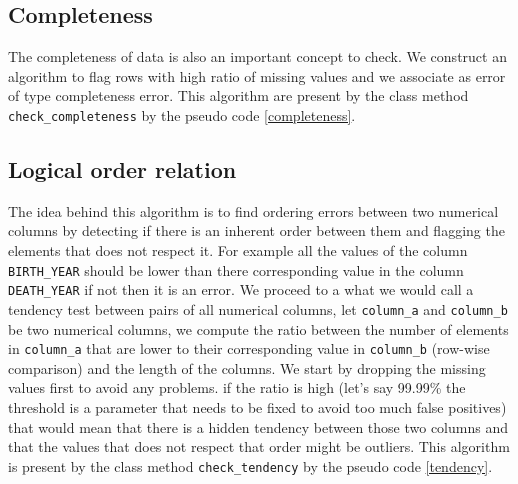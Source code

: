 \documentclass{article}
\begin{document}
\subsection{Completeness} %
\label{sub:Completeness}
The completeness of data is also an important concept to check. We construct an algorithm to flag rows with high ratio of missing values and we associate as error of type completeness error. This algorithm are present by the class method \texttt{check\_completeness} by the pseudo code \ref{completeness}.

\subsection{Logical order relation} %
\label{sub:Logical order relation}
The idea behind this algorithm is to find ordering errors between two numerical columns by detecting if there is an inherent order between them and flagging the elements that does not respect it. For example all the values of the column \texttt{BIRTH\_YEAR} should be lower than there corresponding value in the column \texttt{DEATH\_YEAR} if not then it is an error. We proceed to a what we would call a tendency test between pairs of all numerical columns, let \texttt{column\_a} and \texttt{column\_b} be two numerical columns, we compute the ratio between the number of elements in \texttt{column\_a} that are lower to their corresponding value in \texttt{column\_b} (row-wise comparison) and the length of the columns. We start by dropping the missing values first to avoid any problems. if the ratio is high (let's say 99.99\% the threshold is a parameter that needs to be fixed to avoid too much false positives) that would mean that there is a hidden tendency between those two columns and that the values that does not respect that order might be outliers.
This algorithm is present by the class method \texttt{check\_tendency} by the pseudo code \ref{tendency}.
\end{document}
